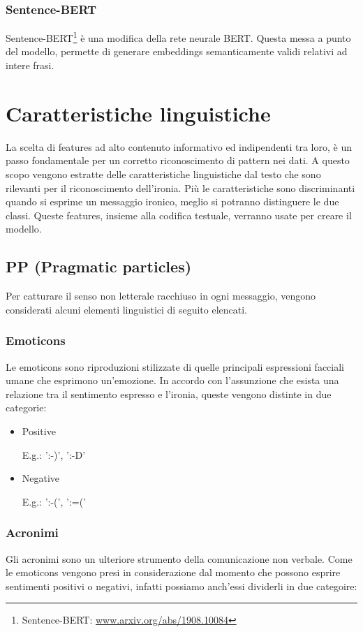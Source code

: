 \documentclass[oneside]{book}
\begin{document}
\subsubsection{Sentence-BERT}
Sentence-BERT\footnote{Sentence-BERT: \url{www.arxiv.org/abs/1908.10084}} è una modifica della rete neurale BERT. Questa messa a punto del modello, permette di generare embeddings semanticamente validi relativi ad intere frasi.


\section{Caratteristiche linguistiche}
La scelta di features ad alto contenuto informativo ed indipendenti tra loro, è un passo fondamentale per un corretto riconoscimento di pattern nei dati.
A questo scopo vengono estratte delle caratteristiche linguistiche dal testo che sono rilevanti per il riconoscimento dell'ironia. Più le caratteristiche sono discriminanti quando si esprime un messaggio ironico, meglio si potranno distinguere le due classi. Queste features, insieme alla codifica testuale, verranno usate per creare il modello.

\subsection{PP (Pragmatic particles)}
Per catturare il senso non letterale racchiuso in ogni messaggio, vengono considerati alcuni elementi linguistici di seguito elencati.

\subsubsection{Emoticons}
Le emoticons sono riproduzioni stilizzate di quelle principali espressioni facciali umane che esprimono un'emozione. In accordo con l'assunzione che esista una relazione tra il sentimento espresso e l'ironia, queste vengono distinte in due categorie:
\begin{itemize}
	\item
	Positive
	
	E.g.: ':-)', ':-D'
	\item
	Negative
	
	E.g.: ':-(', ':=('
	
\end{itemize}

\subsubsection{Acronimi}
Gli acronimi sono un ulteriore strumento della comunicazione non verbale. Come le emoticons vengono presi in considerazione dal momento che possono esprire sentimenti positivi o negativi, infatti possiamo anch'essi dividerli in due categoire:
\end{document}
